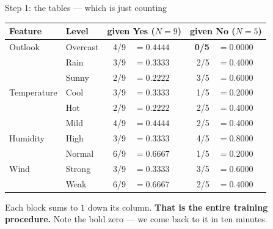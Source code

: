\documentclass[aspectratio=169]{beamer}
\begin{document}
\begin{frame}[shrink=9]{Step 1: the tables --- which is just counting}
\begin{center}\scriptsize
\begin{tabular}{@{}llrlrl@{}}
  \toprule
  \textbf{Feature} & \textbf{Level} & \multicolumn{2}{c}{\textbf{given Yes}
    ($N=9$)} & \multicolumn{2}{c}{\textbf{given No} ($N=5$)}\\
  \midrule
  Outlook & Overcast & 4/9 & $=0.4444$ & \textbf{0/5} & $=\mathbf{0.0000}$\\
          & Rain     & 3/9 & $=0.3333$ & 2/5 & $=0.4000$\\
          & Sunny    & 2/9 & $=0.2222$ & 3/5 & $=0.6000$\\
  \midrule
  Temperature & Cool & 3/9 & $=0.3333$ & 1/5 & $=0.2000$\\
              & Hot  & 2/9 & $=0.2222$ & 2/5 & $=0.4000$\\
              & Mild & 4/9 & $=0.4444$ & 2/5 & $=0.4000$\\
  \midrule
  Humidity & High   & 3/9 & $=0.3333$ & 4/5 & $=0.8000$\\
           & Normal & 6/9 & $=0.6667$ & 1/5 & $=0.2000$\\
  \midrule
  Wind & Strong & 3/9 & $=0.3333$ & 3/5 & $=0.6000$\\
       & Weak   & 6/9 & $=0.6667$ & 2/5 & $=0.4000$\\
  \bottomrule
\end{tabular}
\end{center}
\begin{center}\small
  Each block sums to $1$ down its column. \textbf{That is the entire
  training procedure.} Note the bold zero --- we come back to it in ten
  minutes.
\end{center}
\end{frame}
\end{document}
